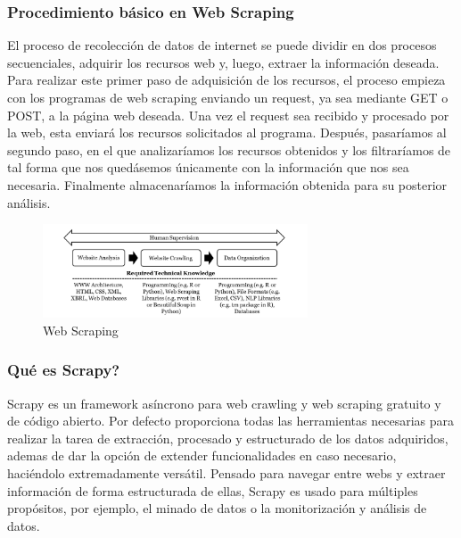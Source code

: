 \subsubsection{Procedimiento básico en Web Scraping}
El proceso de recolección de datos de internet se puede dividir en dos procesos secuenciales, adquirir los recursos web y, luego, extraer la información deseada.
\newline
\newline
Para realizar este primer paso de adquisición de los recursos, el proceso empieza con los programas de web scraping enviando un request, ya sea mediante GET o POST, a la página web deseada. Una vez el request sea recibido y procesado por la web, esta enviará los recursos solicitados al programa. Después, pasaríamos al segundo paso, en el que analizaríamos los recursos obtenidos y los filtraríamos de tal forma que nos quedásemos únicamente con la información que nos sea necesaria. Finalmente almacenaríamos la información obtenida para su posterior análisis.
\newline
\begin{figure} [h!]
	\centering
	\includegraphics[width=0.7\textwidth]{fig/Web-Scraping-Adapted-from-Krotov-and-Tennyson-2018.png}
	\caption[Web Scraping (Krotov y Tennyson 2018)]{Web Scraping}
	\label{fig:ej2}
\end{figure}
\newline

\subsubsection{Qué es Scrapy?}
Scrapy es un framework asíncrono para web crawling y web scraping gratuito y de código abierto. Por defecto proporciona todas las herramientas necesarias para realizar la tarea de extracción, procesado y estructurado de los datos adquiridos, ademas de dar la opción de extender funcionalidades en caso necesario, haciéndolo extremadamente versátil.
\newline
\newline
Pensado para navegar entre webs y extraer información de forma estructurada de ellas, Scrapy es usado para múltiples propósitos, por ejemplo, el minado de datos o la monitorización y análisis de datos.

